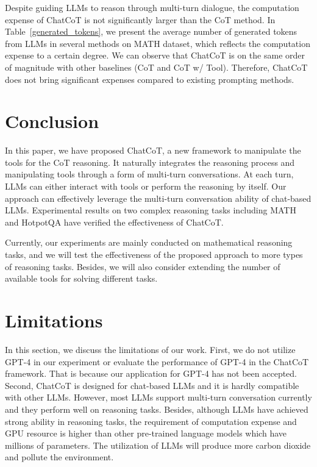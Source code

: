 Despite guiding LLMs to reason through multi-turn dialogue, the computation expense of ChatCoT is not significantly larger than the CoT method.
In Table~\ref{generated_tokens}, we present the average number of generated tokens from LLMs in several methods on MATH dataset, which reflects the computation expense to a certain degree.
We can observe that ChatCoT is on the same order of magnitude with other baselines (\eg CoT and CoT w/ Tool).
Therefore, ChatCoT does not bring significant expenses compared to existing prompting methods.

\section{Conclusion}

In this paper, we have proposed ChatCoT, a new framework to  manipulate the tools  for the CoT reasoning. 
It naturally integrates the reasoning process  and manipulating tools through a form of  multi-turn conversations. 
At each turn, LLMs can either interact
 with tools or perform the reasoning by itself. Our approach can effectively leverage the multi-turn
 conversation ability of chat-based LLMs.  
Experimental results on two complex reasoning tasks including MATH and HotpotQA have verified the effectiveness of ChatCoT.

Currently, our experiments are mainly conducted on mathematical reasoning tasks, and we will test the effectiveness of the proposed approach to more types of reasoning tasks. Besides, we will also consider extending the number of available tools for solving different tasks. 
\section*{Limitations}

In this section, we discuss the limitations of our work.
First, we do not utilize GPT-4 in our experiment or evaluate the performance of GPT-4 in the ChatCoT framework. That is because our application for GPT-4 has not been accepted.
Second, ChatCoT is designed for chat-based LLMs and it is hardly compatible with other LLMs. However, most LLMs support multi-turn conversation currently and they perform well on reasoning tasks.
Besides, although LLMs have achieved strong ability in reasoning tasks, the requirement of computation expense and GPU resource is higher than other pre-trained language models which have millions of parameters. The utilization of LLMs will produce more carbon dioxide and pollute the environment.

